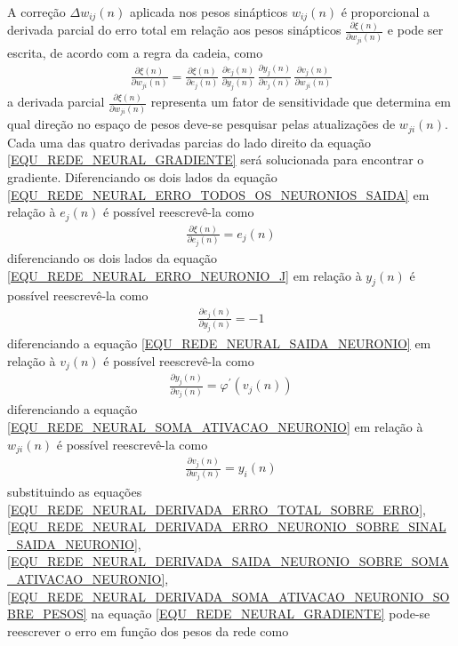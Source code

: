 A correção \(\Delta w_{ij}(n)\) aplicada nos pesos sinápticos \(w_{ij}(n)\) é proporcional a derivada parcial do erro total em relação aos pesos sinápticos \(\frac{\partial \xi(n)}{\partial w_{ji}(n)}\) e pode ser escrita, de acordo com a regra da cadeia, como
\begin{align}
\frac{\partial \xi(n)}{\partial w_{ji}(n)} =
\frac{\partial \xi(n)}{\partial e_{j}(n)} 		\,
\frac{\partial e_{j}(n)}{\partial y_{j}(n)} 	\,
\frac{\partial y_{j}(n)}{\partial v_{j}(n)} 	\,
\frac{\partial v_{j}(n)}{\partial w_{ji}(n)} \label{EQU_REDE_NEURAL_GRADIENTE}
\end{align}
a derivada parcial \(\frac{\partial \xi(n)}{\partial w_{ji}(n)}\) representa um fator de sensitividade que determina em qual direção no espaço de pesos deve-se pesquisar pelas atualizações de \(w_{ji}(n)\). Cada uma das quatro derivadas parcias do lado direito da equação \eqref{EQU_REDE_NEURAL_GRADIENTE} será solucionada para encontrar o gradiente. Diferenciando os dois lados da equação \eqref{EQU_REDE_NEURAL_ERRO_TODOS_OS_NEURONIOS_SAIDA} em relação à \(e_{j}(n)\) é possível reescrevê-la como
\begin{align}
\frac{\partial \xi(n)}{\partial e_{j}(n)} = e_{j}(n) \label{EQU_REDE_NEURAL_DERIVADA_ERRO_TOTAL_SOBRE_ERRO}
\end{align}
diferenciando os dois lados da equação \eqref{EQU_REDE_NEURAL_ERRO_NEURONIO_J} em relação à \(y_{j}(n)\) é possível reescrevê-la como
\begin{align}
\frac{\partial e_{j}(n)}{\partial y_{j}(n)} = -1 \label{EQU_REDE_NEURAL_DERIVADA_ERRO_NEURONIO_SOBRE_SINAL_SAIDA_NEURONIO}
\end{align}
diferenciando a equação \eqref{EQU_REDE_NEURAL_SAIDA_NEURONIO} em relação à \(v_{j}(n)\) é possível reescrevê-la como
\begin{align}
\frac{\partial y_{j}(n)}{\partial v_{j}(n)} = \varphi^{'}(v_{j}(n)) \label{EQU_REDE_NEURAL_DERIVADA_SAIDA_NEURONIO_SOBRE_SOMA_ATIVACAO_NEURONIO}
\end{align}
diferenciando a equação \eqref{EQU_REDE_NEURAL_SOMA_ATIVACAO_NEURONIO} em relação à \(w_{ji}(n)\) é possível reescrevê-la como
\begin{align}
\frac{\partial v_{j}(n)}{\partial w_{j}(n)} = y_{i}(n) \label{EQU_REDE_NEURAL_DERIVADA_SOMA_ATIVACAO_NEURONIO_SOBRE_PESOS}
\end{align}
substituindo as equações \eqref{EQU_REDE_NEURAL_DERIVADA_ERRO_TOTAL_SOBRE_ERRO}, \eqref{EQU_REDE_NEURAL_DERIVADA_ERRO_NEURONIO_SOBRE_SINAL_SAIDA_NEURONIO}, \eqref{EQU_REDE_NEURAL_DERIVADA_SAIDA_NEURONIO_SOBRE_SOMA_ATIVACAO_NEURONIO}, \eqref{EQU_REDE_NEURAL_DERIVADA_SOMA_ATIVACAO_NEURONIO_SOBRE_PESOS} na equação \eqref{EQU_REDE_NEURAL_GRADIENTE} pode-se reescrever o erro em função dos pesos da rede como
